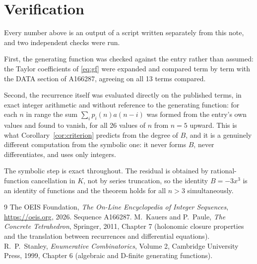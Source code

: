 \documentclass[11pt,a4paper]{article}
\theoremstyle{plain}
\theoremstyle{definition}
\begin{document}
\section{Verification}

Every number above is an output of a script written separately from this note, and two
independent checks were run.

First, the generating function was checked against the entry rather than assumed: the
Taylor coefficients of \eqref{eq:gf} were expanded and compared term by term with the DATA
section of A166287, agreeing on all 13 terms compared.

Second, the recurrence itself was evaluated directly on the published terms, in exact
integer arithmetic and without reference to the generating function: for each $n$ in range
the sum $\sum_{i}p_{i}(n)a(n-i)$ was formed from the entry's own values and found to
vanish, for all 26 values of $n$ from $n=5$ upward. This is what
Corollary~\ref{cor:criterion} predicts from the degree of $B$, and it is a genuinely
different computation from the symbolic one: it never forms $B$, never differentiates, and
uses only integers.

The symbolic step is exact throughout. The residual is obtained by rational-function
cancellation in $K$, not by series truncation, so the identity $B=- 3 x^{3}$ is an
identity of functions and the theorem holds for all $n>3$ simultaneously.

\begin{thebibliography}{9}
 The OEIS Foundation, \emph{The On-Line Encyclopedia of Integer Sequences},
\url{https://oeis.org}, 2026. Sequence A166287.
 M.~Kauers and P.~Paule, \emph{The Concrete Tetrahedron}, Springer, 2011,
Chapter 7 (holonomic closure properties and the translation between recurrences and
differential equations).
 R.~P.~Stanley, \emph{Enumerative Combinatorics}, Volume 2, Cambridge
University Press, 1999, Chapter 6 (algebraic and D-finite generating functions).
\end{thebibliography}
\end{document}

